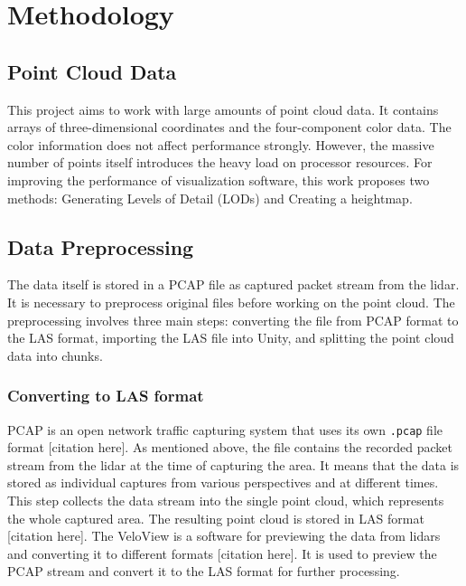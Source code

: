 \chapter{Methodology}
\label{chap:methodology}

\section{Point Cloud Data}
\label{sec:point_cloud_data}

This project aims to work with large amounts of point cloud data. It contains arrays of three-dimensional coordinates and the four-component color data. The color information does not affect performance strongly. However, the massive number of points itself introduces the heavy load on processor resources. For improving the performance of visualization software, this work proposes two methods: Generating Levels of Detail (LODs) and Creating a heightmap.


\section{Data Preprocessing}
\label{sec:data_preprocessing}

The data itself is stored in a PCAP file as captured packet stream from the lidar. It is necessary to preprocess original files before working on the point cloud. The preprocessing involves three main steps: converting the file from PCAP format to the LAS format, importing the LAS file into Unity, and splitting the point cloud data into chunks.

\subsection{Converting to LAS format}
\label{subsec:converting_to_las}

PCAP is an open network traffic capturing system that uses its own \texttt{.pcap} file format [citation here]. As mentioned above, the file contains the recorded packet stream from the lidar at the time of capturing the area. It means that the data is stored as individual captures from various perspectives and at different times.
This step collects the data stream into the single point cloud, which represents the whole captured area. The resulting point cloud is stored in LAS format [citation here].
The VeloView is a software for previewing the data from lidars and converting it to different formats [citation here]. It is used to preview the PCAP stream and convert it to the LAS format for further processing.

